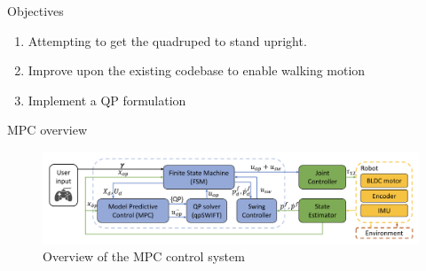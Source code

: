 \documentclass{beamer}
\begin{document}
\begin{frame}{Objectives}
        \begin{enumerate}
            \item{Attempting to get the quadruped to stand upright.}
            \item{Improve upon the existing codebase to enable walking motion}
            \item{Implement a QP formulation}
        \end{enumerate}
\end{frame}\normalfont

\begin{frame}{MPC overview}
\begin{figure}
    \centering
    \includegraphics[width=\linewidth]{Presentation-2/rf-mpc-flow.png}
    \caption{Overview of the MPC control system}
\end{figure}
\end{frame}
\end{document}
